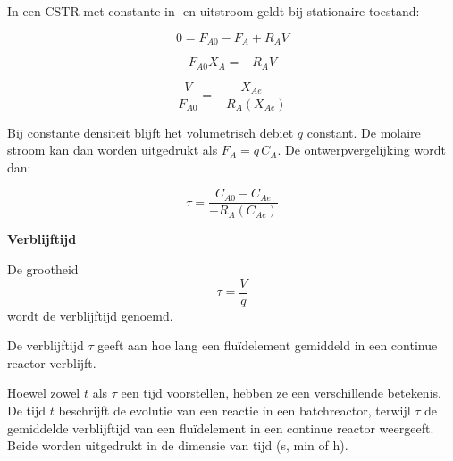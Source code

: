 \documentclass{ximera}
\begin{document}
In een CSTR met constante in- en uitstroom geldt bij stationaire toestand:

\[
0 = F_{A0}-F_A+R_A V
\]

\[
F_{A0}X_A = -R_A V
\]

\[
\boxed{
\frac{V}{F_{A0}} = \frac{X_{Ae}}{-R_A(X_{Ae})}
}
\]

\begin{image}
\end{image} 


Bij constante densiteit blijft het volumetrisch debiet $q$ constant.
De molaire stroom kan dan worden uitgedrukt als $F_A = q\,C_A.$ De ontwerpvergelijking wordt dan:

\[
\boxed{
\tau = \frac{C_{A0}-C_{Ae}}{-R_A(C_{Ae})}
}
\]

\begin{remark} \textbf{Verblijftijd}

De grootheid
\[
\tau=\frac{V}{q}
\]
wordt de verblijftijd genoemd. 

De verblijftijd $\tau$ geeft aan hoe lang een fluïdelement gemiddeld in een continue reactor verblijft.

Hoewel zowel $t$ als $\tau$ een tijd voorstellen, hebben ze een verschillende betekenis. De tijd $t$ beschrijft de evolutie van een reactie in een batchreactor, terwijl $\tau$ de gemiddelde verblijftijd van een fluïdelement in een continue reactor weergeeft. Beide worden uitgedrukt in de dimensie van tijd (s, min of h).
\end{remark}
\end{document}
